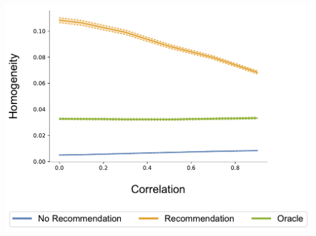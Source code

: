 \documentclass[8pt, aspectratio=43,usenames,dvipsnames]{beamer} %
\begin{document}
{\begin{frame}
\begin{enumerate}
\begin{minipage}{.47\textwidth}
\end{minipage}
\begin{minipage}{.47\textwidth}
\centering
~\\[10pt]
\includegraphics[width=\textwidth]{rho_homogeneity_N_200_T_20.pdf}
\end{minipage}
\end{enumerate}
\end{frame}
}
\end{document}

